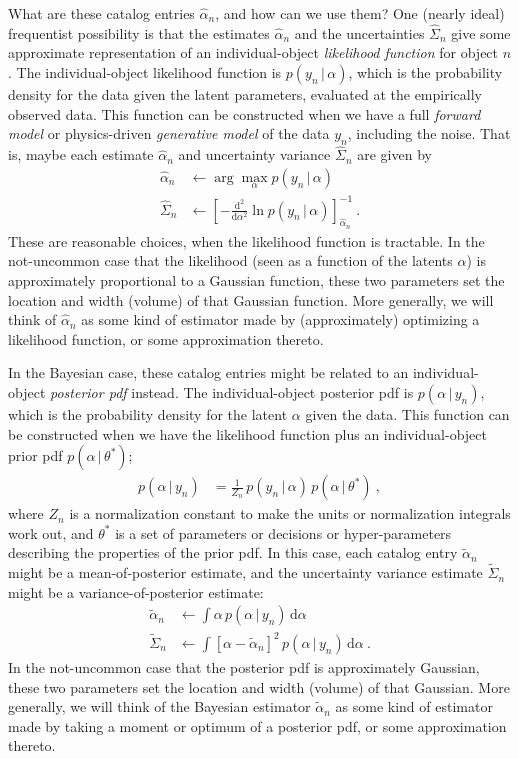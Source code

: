 \documentclass[10pt]{article}
\newcommand{\given}{\,|\,}
\newcommand{\dd}{\mathrm{d}}
\begin{document}
What are these catalog entries $\hat{\alpha}_n$, and how can we use them?
One (nearly ideal) frequentist possibility is that the estimates $\hat{\alpha}_n$ and the uncertainties $\hat{\Sigma}_n$ give some approximate representation of an individual-object \emph{likelihood function} for object $n$.
The individual-object likelihood function is $p(y_n\given\alpha)$, which is the probability density for the data given the latent parameters, evaluated at the empirically observed data.
This function can be constructed when we have a full \emph{forward model} or physics-driven \emph{generative model} of the data $y_n$, including the noise.
That is, maybe each estimate $\hat{\alpha}_n$ and uncertainty variance $\hat{\Sigma}_n$ are given by
\begin{align}
    \hat{\alpha}_n & \leftarrow \arg\max_{\alpha} p(y_n\given\alpha) \\
    \hat{\Sigma}_n & \leftarrow \left[-\frac{\dd^2}{\dd\alpha^2}\ln p(y_n\given\alpha)\right]_{\hat{\alpha}_n}^{-1} ~.
\end{align}
These are reasonable choices, when the likelihood function is tractable.
In the not-uncommon case that the likelihood (seen as a function of the latents $\alpha$) is approximately proportional to a Gaussian function, these two parameters set the location and width (volume) of that Gaussian function.
More generally, we will think of $\hat{\alpha}_n$ as some kind of estimator made by (approximately) optimizing a likelihood function, or some approximation thereto.

In the Bayesian case, these catalog entries might be related to an individual-object \emph{posterior pdf} instead.
The individual-object posterior pdf is $p(\alpha\given y_n)$, which is the probability density for the latent $\alpha$ given the data.
This function can be constructed when we have the likelihood function plus an individual-object prior pdf $p(\alpha\given\theta^\ast)$;
\begin{align}
    p(\alpha\given y_n) &= \frac{1}{Z_n}\,p(y_n\given\alpha)\,p(\alpha\given\theta^\ast) ~,
\end{align}
where $Z_n$ is a normalization constant to make the units or normalization integrals work out,
and $\theta^\ast$ is a set of parameters or decisions or hyper-parameters describing the properties of the prior pdf.
In this case, each catalog entry $\tilde{\alpha}_n$ might be a mean-of-posterior estimate, and the uncertainty variance estimate $\tilde{\Sigma}_n$ might be a variance-of-posterior estimate:
\begin{align}
    \tilde{\alpha}_n & \leftarrow \int \alpha\,p(\alpha\given y_n)\,\dd\alpha \\
    \tilde{\Sigma}_n & \leftarrow \int [\alpha - \tilde{\alpha}_n]^2\,p(\alpha\given y_n)\,\dd\alpha ~.
\end{align}
In the not-uncommon case that the posterior pdf is approximately Gaussian, these two parameters set the location and width (volume) of that Gaussian.
More generally, we will think of the Bayesian estimator $\tilde{\alpha}_n$ as some kind of estimator made by taking a moment or optimum of a posterior pdf, or some approximation thereto.
\end{document}
